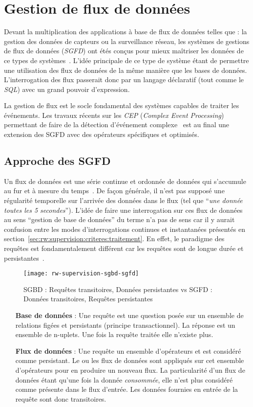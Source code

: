 \section{Gestion de flux de données}\label{sec:rw:supervision:datastream}
Devant la multiplication des applications à base de flux de données telles que : la gestion des données de capteurs ou la surveillance réseau, les systèmes de gestions de flux de données (\textit{SGFD}) ont étés conçus pour mieux maîtriser les données de ce types de systèmes~\cite{Madden:tag, Yao:cougar, Cranor:gigascope}. L'idée principale de ce type de système étant de permettre une utilisation des flux de données de la même manière que les bases de données. L'interrogation des flux passerait donc par un langage déclaratif (tout comme le \textit{SQL}) avec un grand pouvoir d'expression.

La gestion de flux est le socle fondamental des systèmes capables de traiter les événements. Les travaux récents sur les \textit{CEP} (\textit{Complex Event Processing}) permettant de faire de la détection d'événement complexe~\cite{Brenna:cayuga} est au final une extension des SGFD avec des opérateurs spécifiques et optimisés.
\subsection{Approche des SGFD}
Un flux de données est une série continue et ordonnée de données qui s'accumule au fur et à mesure du temps~\cite{Golab:issues}. De façon générale, il n'est pas supposé une régularité temporelle sur l'arrivée des données dans le flux (tel que \enquote{\it une donnée toutes les 5 secondes}). L'idée de faire une interrogation sur ces flux de données au sens \enquote{gestion de base de données} du terme n'a pas de sens car il y aurait confusion entre les modes d'interrogations continues et instantanées présentés en section~\ref{sec:rw:supervision:criteres:traitement}. En effet, le paradigme des requêtes est fondamentalement différent car les requêtes sont de longue durée et persistantes~\cite{Chen:niagaracq}.
\begin{figure}[ht]
    \centering
    \texttt{[image: rw-supervision-sgbd-sgfd]}
    \caption{SGBD : Requêtes transitoires, Données persistantes vs SGFD : Données transitoires, Requêtes persistantes~\cite{Gurgen:sstreamware}}
\end{figure}

\begin{itemize}
    \item[\textbf{Base de données}] : Une requête est une question posée sur un ensemble de relations figées et persistants (principe transactionnel). La réponse est un ensemble de n-uplets. Une fois la requête traitée elle n'existe plus.
    \item[\textbf{Flux de données}] : Une requête un ensemble d'opérateurs et est considéré comme persistant. Le ou les flux de données sont appliqués sur cet ensemble d'opérateurs pour en produire un nouveau flux. La particularité d'un flux de données étant qu'une fois la donnée \textit{consommée}, elle n'est plus considéré comme présente dans le flux d'entrée. Les données fournies en entrée de la requête sont donc transitoires.
\end{itemize}

